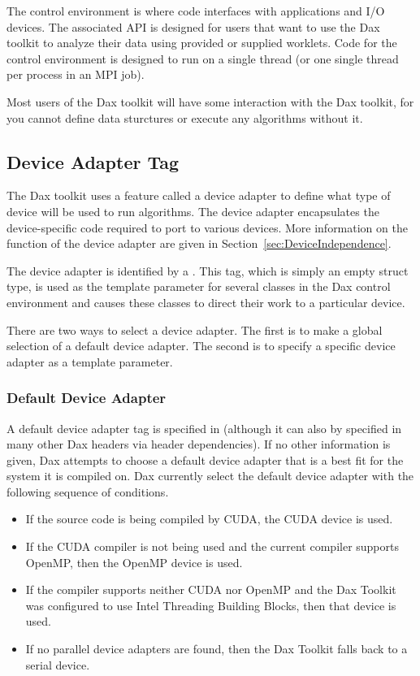 The control environment is where code interfaces with applications and
I/O devices. The associated API is designed for users that want to use the
Dax toolkit to analyze their data using provided or supplied worklets. Code
for the control environment is designed to run on a single thread (or one
single thread per process in an MPI job).

Most users of the Dax toolkit will have some interaction with the Dax
toolkit, for you cannot define data sturctures or execute any algorithms
without it.

\subsection{Device Adapter Tag}
\label{sec:DeviceAdapterTag}


The Dax toolkit uses a feature called a device adapter to define what type
of device will be used to run algorithms. The device adapter encapsulates
the device-specific code required to port to various devices. More
information on the function of the device adapter are given in
Section~\ref{sec:DeviceIndependence}.

The device adapter is identified by a .
 This tag, which is simply an empty struct type,
is used as the template parameter for several classes in the Dax control
environment and causes these classes to direct their work to a particular
device.

There are two ways to select a device adapter. The first is to make a
global selection of a default device adapter. The second is to specify a
specific device adapter as a template parameter.

\subsubsection{Default Device Adapter}

A default device adapter tag is specified in
 (although it can also by specified in
many other Dax headers via header dependencies). If no other information is
given, Dax attempts to choose a default device adapter that is a best fit
for the system it is compiled on. Dax currently select the default device
adapter with the following sequence of conditions.

\begin{itemize}
\item {} If the source code is being compiled by CUDA, the CUDA
  device is used.
\item {} If the CUDA compiler is not being used and the current
  compiler supports OpenMP, then the OpenMP device is used.
\item {}  If the compiler
  supports neither CUDA nor OpenMP and the Dax Toolkit was configured to
  use Intel Threading Building Blocks, then that device is used.
\item {} If no parallel device adapters are found, then the Dax
  Toolkit falls back to a serial device.
\end{itemize}


